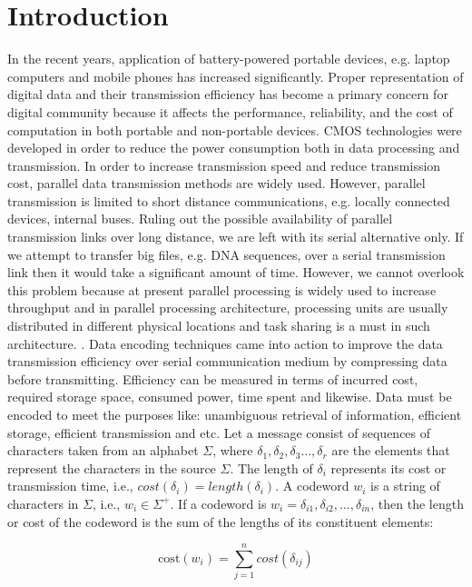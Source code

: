 \documentclass[preprint,12pt]{elsarticle}
\begin{document}

\section{Introduction}
\label{sec1}
In the recent years, application of battery-powered portable devices, e.g. laptop computers and mobile phones has increased significantly. Proper representation of digital data and their transmission efficiency has become a primary concern for digital community because it affects the performance, reliability, and the cost of computation in both portable and non-portable devices. CMOS technologies were developed in order to reduce the power consumption both in data processing and transmission. In order to increase transmission speed and reduce transmission cost, parallel data transmission methods are widely used. However, parallel transmission is limited to short distance communications, e.g. locally connected devices, internal buses. Ruling out the possible availability of parallel transmission links over long distance, we are left with its serial alternative only. If we attempt to transfer big files, e.g. DNA sequences, over a serial transmission link then it would take a significant amount of time. However, we cannot overlook this problem because at present parallel processing is widely used to increase throughput and in parallel processing architecture, processing units are usually distributed in different physical locations and task sharing is a must in such architecture.    
.
Data encoding techniques came into action to improve the data transmission efficiency over serial communication medium by compressing data before transmitting. Efficiency can be measured in terms of incurred cost, required storage space, consumed power, time spent and likewise. Data must be encoded to meet the purposes like: unambiguous retrieval of information, efficient storage, efficient transmission and etc. Let a message consist of sequences of characters taken from an alphabet $\Sigma$, where  $\delta_1,\delta_2,\delta_3\ldots,\delta_r$ are the elements that represent the characters in the source $\Sigma$. The length of $\delta_i$ represents its cost or transmission time, i.e., $cost\left(\delta_i\right)= length(\delta_i)$. A codeword $w_i$ is a string of characters in $\Sigma$, i.e., $w_i\in\Sigma^{+}$. If a codeword is $w_i=\delta_{i1},\delta_{i2},\ldots,\delta_{in}$, then the length or cost of the codeword is the sum of the lengths of its constituent elements:

\begin{equation}
\label{eqn1}
  \text{cost}\left(w_i\right)=\sum_{j=1}^{n}cost\left(\delta_{ij}\right)
\end{equation} 
  
\end{document}

